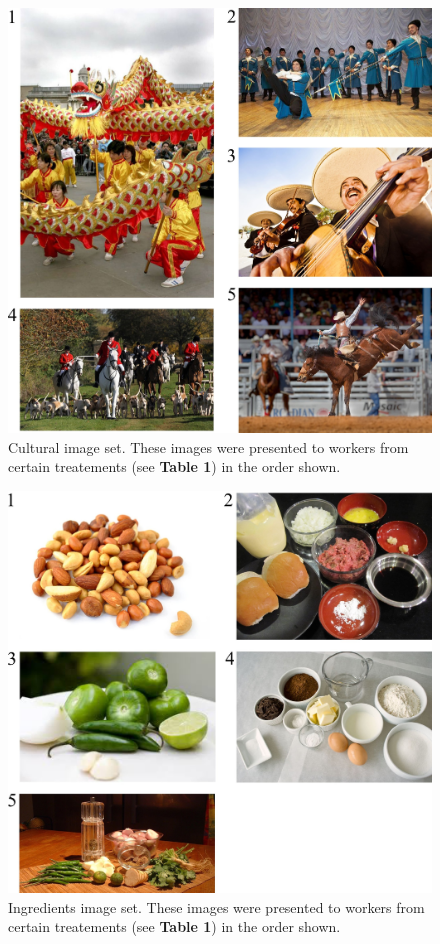 \documentclass[a4paper]{report}
\begin{document}
\begin{figure}
	\includegraphics[scale=1.00]{figs/taskImages/cultural.jpg}
	\caption{Cultural image set. These images were presented to workers from 
		certain treatements (see \textbf{Table 1}) in the order shown.}
\end{figure}

\begin{figure}
	\includegraphics[scale=1.00]{figs/taskImages/ingredients.jpg}
	\caption{ Ingredients image set. These images were presented to workers 
		from certain treatements (see \textbf{Table 1}) in the order shown.}
\end{figure}
\end{document}
